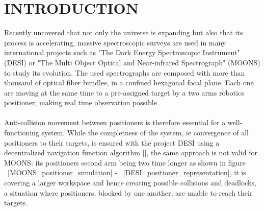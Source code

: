 \documentclass[]{spie}  %
\begin{document}
	
	\section{INTRODUCTION}
	\label{INTRODUCTION}
	Recently uncovered that not only the universe is expanding but also that its process is accelerating, massive spectroscopic surveys are used in many international projects such as  "The Dark Energy Spectroscopic Instrument" (DESI) or  "The Multi Object Optical and Near-infrared Spectrograph" (MOONS) to study its evolution. The used spectrographs are composed with more than thousand of optical fiber bundles, in a confined hexagonal focal plane. Each one are moving at the same time to a pre-assigned target by a two arms robotics positioner, making real time observation possible.\\\\
	Anti-collision movement between positioners is therefore essential for a well-functioning system. While the completness of the system, ie convergence of all positioners to their targets, is ensured with the project DESI using a decentralized navigation function algorithm  [], the same approach is not valid for MOONS: its positioners second arm being two time longer as shown in figure ~\ref{MOONS_positioner_simulation} - ~\ref{DESI_positioner_representation}, it is covering a larger workspace and hence creating possible collisions and deadlocks, a situation where positioners, blocked by one another, are unable to reach their targets.\\
	
\end{document}
